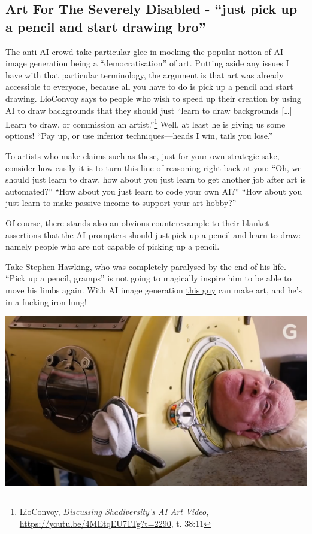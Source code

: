 \documentclass[11pt]{article}
\begin{document}
\subsection*{Art For The Severely Disabled - ``just pick up a pencil and start drawing bro''}
\label{sec:orgf20b5ed}
The anti-AI crowd take particular glee in mocking the popular notion of AI image generation being a ``democratisation'' of art. Putting aside any issues I have with that particular terminology, the argument is that art was already accessible to everyone, because all you have to do is pick up a pencil and start drawing. LioConvoy says to people who wish to speed up their creation by using AI to draw backgrounds that they should just ``learn to draw backgrounds [\ldots{}] Learn to draw, or commission an artist.''\footnote{LioConvoy, \emph{Discussing Shadiversity's AI Art Video}, \url{https://youtu.be/4MEtqEU71Tg?t=2290}, t. 38:11} Well, at least he is giving us some options! ``Pay up, or use inferior techniques---heads I win, tails you lose.''

To artists who make claims such as these, just for your own strategic sake, consider how easily it is to turn this line of reasoning right back at you: ``Oh, we should just learn to draw, how about you just learn to get another job after art is automated?'' ``How about you just learn to code your own AI?'' ``How about you just learn to make passive income to support your art hobby?''

Of course, there stands also an obvious counterexample to their blanket assertions that the AI prompters should just pick up a pencil and learn to draw: namely people who are not capable of picking up a pencil.

Take Stephen Hawking, who was completely paralysed by the end of his life. ``Pick up a pencil, gramps'' is not going to magically inspire him to be able to move his limbs again. With AI image generation \href{https://www.youtube.com/watch?v=gplA6pq9cOs}{this guy} can make art, and he's in a fucking iron lung!

\begin{center}
\includegraphics[width=.9\linewidth]{./images/iron-lung.png}
\end{center}
\end{document}
